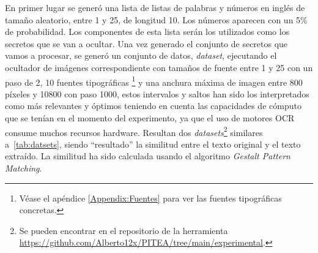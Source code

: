 En primer lugar se generó una lista de listas de palabras y números en inglés de tamaño aleatorio, entre 1 y 25, de longitud 10. Los números aparecen con un 5\% de probabilidad. Los componentes de esta lista serán los utilizados como los secretos que se van a ocultar.
Una vez generado el conjunto de secretos que vamos a procesar, se generó un conjunto de datos, \textit{dataset}, ejecutando el ocultador de imágenes correspondiente con tamaños de fuente entre 1 y 25 con un paso de 2, 10 fuentes tipográficas \footnote{Véase el apéndice \ref{Appendix:Fuentes} para ver las fuentes tipográficas concretas.} y una anchura máxima de imagen entre 800 píxeles y 10800 con paso 1000, estos intervalos y saltos han sido los interpretados como más relevantes y óptimos teniendo en cuenta las capacidades de cómputo que se tenían en el momento del experimento, ya que el uso de motores OCR consume muchos recursos hardware. Resultan dos \textit{datasets}\footnote{Se pueden encontrar en el repositorio de la herramienta \url{https://github.com/Alberto12x/PITEA/tree/main/experimental}.} similares a~\ref{tab:datsets}, siendo ``resultado'' la similitud entre el texto original y el texto extraído. La similitud ha sido calculada usando el algoritmo \textit{Gestalt Pattern Matching}.


\begin{table}[h]
	\centering
	\caption[Ejemplo de \textit{datasets} generados]{Ejemplo de \textit{datasets} generados.}
	\label{tab:datsets}
\end{table}
\newpage

